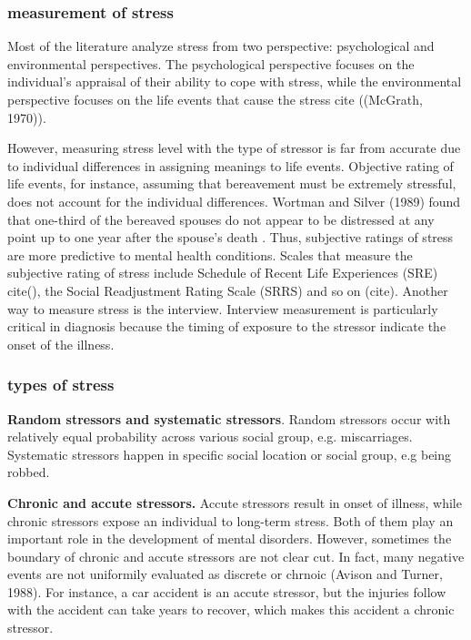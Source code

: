 \subsubsection{measurement of stress}
Most of the literature analyze stress from two perspective: psychological and environmental perspectives. The psychological perspective focuses on the individual's appraisal of their ability to cope with stress, while the environmental perspective focuses on the life events that cause the stress cite ((McGrath, 1970)). 

However, measuring stress level with the type of stressor is far from accurate due to individual differences in assigning meanings to life events. Objective rating of life events, for instance, assuming that bereavement must be extremely stressful, does not account for the individual differences.  Wortman
and Silver (1989) found that one-third of the bereaved spouses do not appear to be distressed at any point up to one year after the spouse's death \cite{wortman1989myths}. Thus, subjective ratings of stress are more predictive to mental health conditions.  Scales that measure the subjective rating of stress include Schedule of Recent Life Experiences (SRE) cite(), the Social Readjustment Rating Scale (SRRS) and so on (cite). Another way to measure stress is the interview. Interview measurement is particularly critical in diagnosis because the timing of exposure to the stressor indicate the onset of the illness.


\subsubsection{types of stress}
\textbf{Random stressors and systematic stressors}. Random stressors occur with relatively equal probability across various social group, e.g. miscarriages. Systematic stressors happen in specific social location or social group, e.g being robbed. 

\textbf{Chronic and accute stressors.}  Accute stressors result in onset of illness, while chronic stressors expose an individual to long-term stress. Both of them play an important role in the development of mental disorders. However, sometimes the boundary of chronic and accute stressors are not clear cut. In fact, many negative events are not uniformily evaluated as discrete or chrnoic (Avison and Turner, 1988). For instance, a car accident is an accute stressor, but the injuries follow with the accident can take years to recover, which makes this accident a chronic stressor.

